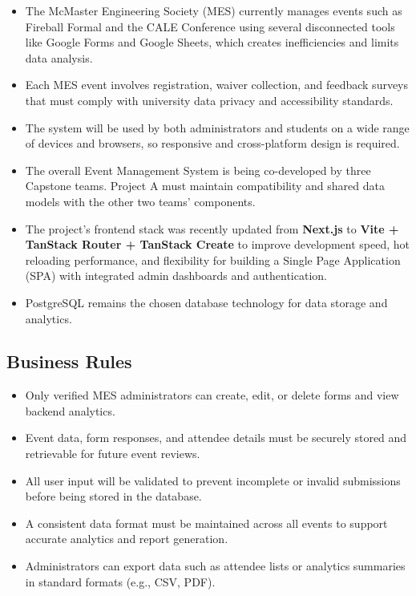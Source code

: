 \documentclass[12pt]{article}
\begin{document}
\begin{itemize}
    \item The McMaster Engineering Society (MES) currently manages events such as Fireball Formal and the CALE Conference using several disconnected tools like Google Forms and Google Sheets, which creates inefficiencies and limits data analysis.
    \item Each MES event involves registration, waiver collection, and feedback surveys that must comply with university data privacy and accessibility standards.
    \item The system will be used by both administrators and students on a wide range of devices and browsers, so responsive and cross-platform design is required.
    \item The overall Event Management System is being co-developed by three Capstone teams. Project A must maintain compatibility and shared data models with the other two teams’ components.
    \item The project’s frontend stack was recently updated from \textbf{Next.js} to \textbf{Vite + TanStack Router + TanStack Create} to improve development speed, hot reloading performance, and flexibility for building a Single Page Application (SPA) with integrated admin dashboards and authentication.
    \item PostgreSQL remains the chosen database technology for data storage and analytics.
\end{itemize}

\subsection{Business Rules}

\begin{itemize}
    \item Only verified MES administrators can create, edit, or delete forms and view backend analytics.
    \item Event data, form responses, and attendee details must be securely stored and retrievable for future event reviews.
    \item All user input will be validated to prevent incomplete or invalid submissions before being stored in the database.
    \item A consistent data format must be maintained across all events to support accurate analytics and report generation.
    \item Administrators can export data such as attendee lists or analytics summaries in standard formats (e.g., CSV, PDF).
\end{itemize}
\end{document}
